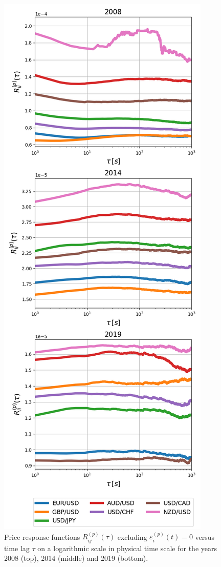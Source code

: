 \begin{figure}[htbp]
    \centering
    \includegraphics[width=\columnwidth]
    {figures/04_responses_physical_scale.png}
    \caption{Price response functions
             $R^{\left(p\right)}_{ij}\left(\tau\right)$ excluding
             $\varepsilon^{\left(p\right)}_{i}\left(t\right) = 0$ versus time
             lag $\tau$ on a logarithmic scale in physical time scale for the
             years 2008 (top), 2014 (middle) and 2019 (bottom).}
    \label{fig:market_response_time_scale}
\end{figure}

